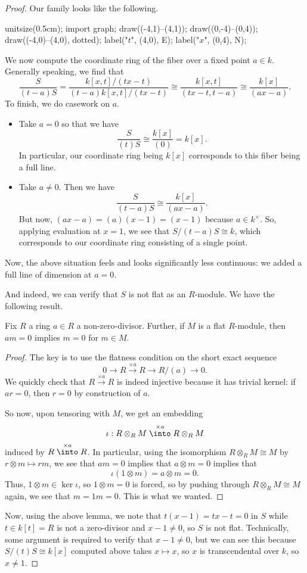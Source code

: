 \begin{proof}
	Our family looks like the following.
	\begin{center}
		\begin{asy}
			unitsize(0.5cm);
			import graph;
			draw((-4,1)--(4,1));
			draw((0,-4)--(0,4));
			draw((-4,0)--(4,0), dotted); label("$t$", (4,0), E);
			label("$x$", (0,4), N);
		\end{asy}
	\end{center}
	We now compute the coordinate ring of the fiber over a fixed point $a\in k$. Generally speaking, we find that
	\[\frac S{(t-a)S}=\frac{k[x,t]/(tx-t)}{(t-a)k[x,t]/(tx-t)}\cong\frac{k[x,t]}{(tx-t,t-a)}\cong\frac{k[x]}{(ax-a)}.\]
	To finish, we do casework on $a$.
	\begin{itemize}
		\item Take $a=0$ so that we have
		\[\frac S{(t)S}\cong\frac{k[x]}{(0)}=k[x].\]
		In particular, our coordinate ring being $k[x]$ corresponds to this fiber being a full line.
		\item Take $a\ne0$. Then we have
		\[\frac S{(t-a)S}\cong\frac{k[x]}{(ax-a)}.\]
		But now, $(ax-a)=(a)(x-1)=(x-1)$ because $a\in k^\times$. So, applying evaluation at $x=1$, we see that $S/(t-a)S\cong k$, which corresponds to our coordinate ring consisting of a single point.
	\end{itemize}
	Now, the above situation feels and looks significantly less continuous: we added a full line of dimension at $a=0$.

	And indeed, we can verify that $S$ is not flat as an $R$-module. We have the following result.
	\begin{lemma}
		Fix $R$ a ring $a\in R$ a non-zero-divisor. Further, if $M$ is a flat $R$-module, then $am=0$ implies $m=0$ for $m\in M$.
	\end{lemma}
	\begin{proof}
		The key is to use the flatness condition on the short exact sequence
		\[0\to R\stackrel{\times a}\to R\to R/(a)\to 0.\]
		We quickly check that $R\stackrel{\times a}\to R$ is indeed injective because it has trivial kernel: if $ar=0$, then $r=0$ by construction of $a$.

		So now, upon tensoring with $M$, we get an embedding
		\[\iota:R\otimes_RM\stackrel{\times a}\into R\otimes_RM\]
		induced by $R\stackrel{\times a}\into R$. In particular, using the isomorphism $R\otimes_RM\cong M$ by $r\otimes m\mapsto rm$, we see that $am=0$ implies that $a\otimes m=0$ implies that
		\[\iota(1\otimes m)=a\otimes m=0.\]
		Thus, $1\otimes m\in\ker\iota$, so $1\otimes m=0$ is forced, so by pushing through $R\otimes_RM\cong M$ again, we see that $m=1m=0$. This is what we wanted.
	\end{proof}
	Now, using the above lemma, we note that $t(x-1)=tx-t=0$ in $S$ while $t\in k[t]=R$ is not a zero-divisor and $x-1\ne0$, so $S$ is not flat. Technically, some argument is required to verify that $x-1\ne0$, but we can see this because $S/(t)S\cong k[x]$ computed above takes $x\mapsto x$, so $x$ is transcendental over $k$, so $x\ne1$.
\end{proof}

